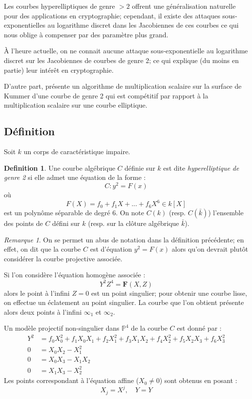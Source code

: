 \documentclass[a4paper,12pt]{article}
\theoremstyle{definition}
\newtheorem{definition}{Definition}[section]
\theoremstyle{remark}
\newtheorem{remarque}{Remarque}
\numberwithin{equation}{section}
\begin{document}
Les courbes hyperelliptiques de genre $> 2$ offrent une généralisation naturelle pour des applications en cryptographie; cependant, il existe des attaques sous-exponentielles au logarithme discret dans les Jacobiennes de ces courbes \citep{gaudry2} ce qui nous oblige à compenser par des paramètre plus grand.

À l'heure actuelle, on ne connait aucune attaque sous-exponentielle au logarithme discret sur les Jacobiennes de courbes de genre 2; ce qui explique (du moins en partie) leur intérêt en cryptographie.

D'autre part, \citet{gaudry} présente un algorithme de multiplication scalaire sur la surface de Kummer d'une courbe de genre 2 qui est compétitif par rapport à la multiplication scalaire sur une courbe elliptique.

\subsection{Définition}
Soit $k$ un corps de caractéristique impaire.

\begin{definition}
Une courbe algébrique $C$ définie sur $k$ est dite \emph{hyperelliptique de genre 2} si elle admet une équation de la forme :
$$C : y^2 = F(x)$$
où $$F(X) = f_0 + f_1X + ... + f_6X^6 \in k[X]$$
est un polynôme séparable de degré 6. On note $C(k)$ (resp. $C(\bar{k})$) l'ensemble des points de $C$ défini sur $k$ (resp. sur la clôture algébrique $\bar{k}$).
\end{definition}

\begin{remarque}
On se permet un abus de notation dans la définition précédente; en effet, on dit que la courbe $C$ est d'équation $y^2 = F(x)$ alors qu'on devrait plutôt considérer la courbe projective associée.

Si l'on considère l'équation homogène associée :
$$Y^2Z^4 = \mathbf{F}(X,Z)$$
alors le point à l'infini $Z=0$ est un point singulier; pour obtenir une courbe lisse, on effectue un éclatement au point singulier. La courbe que l'on obtient présente alors deux points à l'infini $\infty_1$ et $\infty_2$.

Un modèle projectif non-singulier dans $\mathbb{P}^4$ de la courbe $C$ est donné par \citep{cassels-Flynn} :
\begin{align*}
Y^2 &= f_0X_0^2 + f_1X_0X_1 + f_2X_1^2 + f_3X_1X_2 + f_4X_2^2 + f_5X_2X_3 + f_6X_3^2 \\
0 &= X_0X_2 - X_1^2 \\
0 &= X_0X_3 - X_1X_2 \\
0 &= X_1X_3 - X_2^2
\end{align*}
Les points correspondant à l'équation affine ($X_0 \neq 0$) sont obtenus en posant :
$$X_j = X^j, \quad Y = Y$$
\end{remarque}
\end{document}

